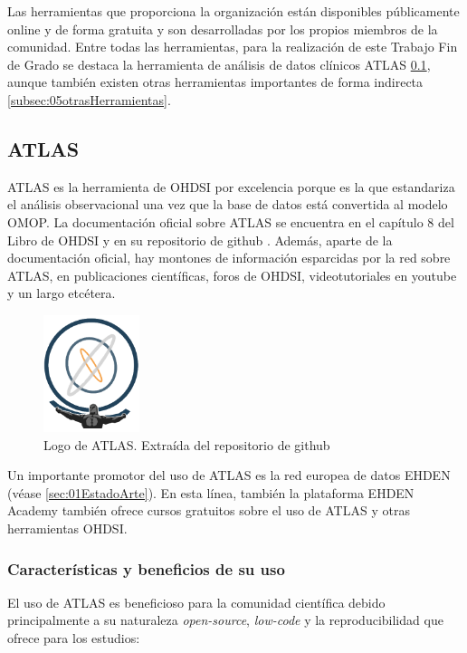 Las herramientas que proporciona la organización están disponibles públicamente online y de forma gratuita y son desarrolladas por los propios miembros de la comunidad. Entre todas las herramientas, para la realización de este Trabajo Fin de Grado se destaca la herramienta de análisis de datos clínicos ATLAS \ref{subsec:05ATLAS}, aunque también existen otras herramientas importantes de forma indirecta \ref{subsec:05otrasHerramientas}.

\subsection{ATLAS} \label{subsec:05ATLAS}

ATLAS es la herramienta de OHDSI por excelencia porque es la que estandariza el análisis observacional una vez que la base de datos está convertida al modelo OMOP. La documentación oficial sobre ATLAS se encuentra en el capítulo 8 del Libro de OHDSI y en su repositorio de github \cite{githubATLAS}. Además, aparte de la documentación oficial, hay montones de información esparcidas por la red sobre ATLAS, en publicaciones científicas, foros de OHDSI, videotutoriales en youtube y un largo etcétera.

\begin{figure}[H]
\centering
\includegraphics[width=0.25\textwidth]{figures/ATLASlogo.png}
     \caption{Logo de ATLAS. Extraída del repositorio de github \cite{githubATLAS}}
    \label{fig:ATLASlogo}
\end{figure}

Un importante promotor del uso de ATLAS es la red europea de datos EHDEN \cite{ehden} (véase \ref{sec:01EstadoArte}). En esta línea, también la plataforma EHDEN Academy también ofrece cursos gratuitos sobre el uso de ATLAS y otras herramientas OHDSI.

\subsubsection{Características y beneficios de su uso}

El uso de ATLAS es beneficioso para la comunidad científica debido principalmente a su naturaleza \textit{open-source}, \textit{low-code} y la reproducibilidad que ofrece para los estudios:

